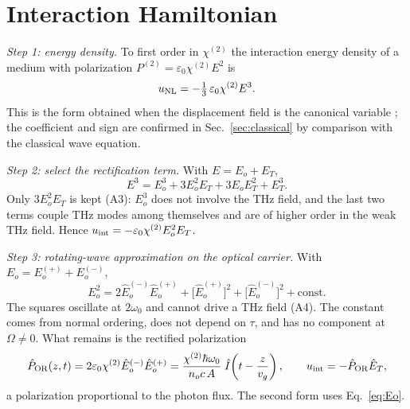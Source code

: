 \documentclass[aps,pra,onecolumn,notitlepage,11pt,amsmath,amssymb,nofootinbib]{revtex4-2}
\newcommand{\Iop}{\hat I}
\begin{document}
\section{Interaction Hamiltonian}

\emph{Step 1: energy density.} To first order in $\chi^{(2)}$ the interaction
energy density of a medium with polarization
$P^{(2)}=\varepsilon_0\chi^{(2)}E^2$ is
\begin{equation}
u_{\rm NL}=-\tfrac13\,\varepsilon_0\chi^{(2)}E^3 .
\end{equation}
This is the form obtained when the displacement field is the canonical
variable \cite{quesada2017}; the coefficient and sign are confirmed in
Sec.~\ref{sec:classical} by comparison with the classical wave equation.

\emph{Step 2: select the rectification term.} With $E=E_o+E_T$,
\begin{equation}
E^3=E_o^3+3E_o^2E_T+3E_oE_T^2+E_T^3 .
\end{equation}
Only $3E_o^2E_T$ is kept (A3): $E_o^3$ does not involve the THz field, and the
last two terms couple THz modes among themselves and are of higher order in
the weak THz field. Hence $u_{\rm int}=-\varepsilon_0\chi^{(2)}E_o^2E_T$.

\emph{Step 3: rotating-wave approximation on the optical carrier.} With
$E_o=E_o^{(+)}+E_o^{(-)}$,
\begin{equation}
E_o^2=2\hat E_o^{(-)}\hat E_o^{(+)}+\big[\hat E_o^{(+)}\big]^2
+\big[\hat E_o^{(-)}\big]^2+\text{const}.
\end{equation}
The squares oscillate at $2\omega_0$ and cannot drive a THz field (A4). The
constant comes from normal ordering, does not depend on $\tau$, and has no
component at $\Omega\neq0$. What remains is the rectified polarization
\begin{equation}
\hat P_{\rm OR}(z,t)=2\varepsilon_0\chi^{(2)}\hat E_o^{(-)}\hat E_o^{(+)}
=\frac{\chi^{(2)}\hbar\omega_0}{n_oc\,A}\;\Iop\!\left(t-\frac{z}{v_g}\right),
\qquad u_{\rm int}=-\hat P_{\rm OR}\hat E_T ,
\label{eq:POR}
\end{equation}
a polarization proportional to the photon flux. The second form uses
Eq.~\eqref{eq:Eo}.
\end{document}
